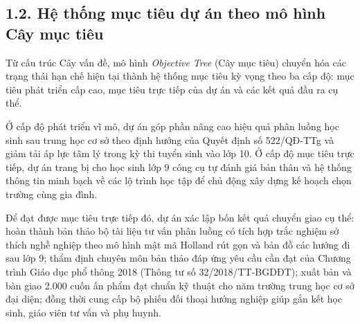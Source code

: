 \begin{figure}[htbp]
{%
}
\end{figure}

\subsection*{1.2. Hệ thống mục tiêu dự án theo mô hình Cây mục tiêu}

Từ cấu trúc Cây vấn đề, mô hình \textit{Objective Tree} (Cây mục tiêu) chuyển hóa các trạng thái hạn chế hiện tại thành hệ thống mục tiêu kỳ vọng theo ba cấp độ: mục tiêu phát triển cấp cao, mục tiêu trực tiếp của dự án và các kết quả đầu ra cụ thể.

Ở cấp độ phát triển vĩ mô, dự án góp phần nâng cao hiệu quả phân luồng học sinh sau trung học cơ sở theo định hướng của Quyết định số 522/QĐ-TTg và giảm tải áp lực tâm lý trong kỳ thi tuyển sinh vào lớp 10. Ở cấp độ mục tiêu trực tiếp, dự án trang bị cho học sinh lớp 9 công cụ tự đánh giá bản thân và hệ thống thông tin minh bạch về các lộ trình học tập để chủ động xây dựng kế hoạch chọn trường cùng gia đình.

Để đạt được mục tiêu trực tiếp đó, dự án xác lập bốn kết quả chuyển giao cụ thể: hoàn thành bản thảo bộ tài liệu tư vấn phân luồng có tích hợp trắc nghiệm sở thích nghề nghiệp theo mô hình mật mã Holland rút gọn và bản đồ các hướng đi sau lớp 9; thẩm định chuyên môn bản thảo đáp ứng yêu cầu cần đạt của Chương trình Giáo dục phổ thông 2018 (Thông tư số 32/2018/TT-BGDĐT); xuất bản và bàn giao 2.000 cuốn ấn phẩm đạt chuẩn kỹ thuật cho năm trường trung học cơ sở đại diện; đồng thời cung cấp bộ phiếu đối thoại hướng nghiệp giúp gắn kết học sinh, giáo viên tư vấn và phụ huynh.

